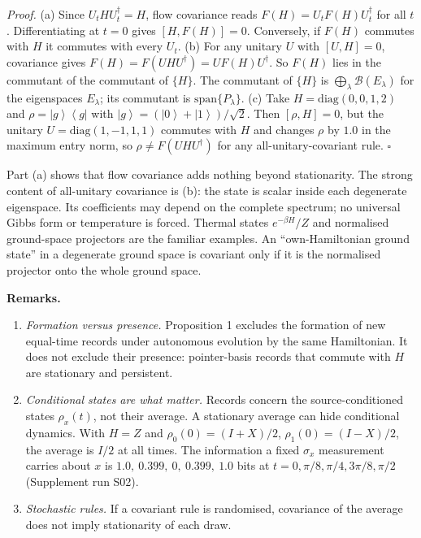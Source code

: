 \documentclass[
  10pt,
  a4paper,
]{article}
\providecommand{\tightlist}{%
  \setlength{\itemsep}{0pt}\setlength{\parskip}{0pt}}
\begin{document}
\emph{Proof.} (a) Since \(U_tHU_t^\dagger=H\), flow covariance reads
\(F(H)=U_tF(H)U_t^\dagger\) for all \(t\). Differentiating at \(t=0\)
gives \([H,F(H)]=0\). Conversely, if \(F(H)\) commutes with \(H\) it
commutes with every \(U_t\). (b) For any unitary \(U\) with \([U,H]=0\),
covariance gives \(F(H)=F(UHU^\dagger)=UF(H)U^\dagger\). So \(F(H)\)
lies in the commutant of the commutant of \(\{H\}\). The commutant of
\(\{H\}\) is \(\bigoplus_\lambda\mathcal B(E_\lambda)\) for the
eigenspaces \(E_\lambda\); its commutant is
\(\mathrm{span}\{P_\lambda\}\). (c) Take \(H=\mathrm{diag}(0,0,1,2)\)
and \(\rho=\left| g\right\rangle \left\langle  g\right|\) with
\(\left| g\right\rangle =(\left| 0\right\rangle +\left| 1\right\rangle )/\sqrt2\).
Then \([\rho,H]=0\), but the unitary \(U=\mathrm{diag}(1,-1,1,1)\)
commutes with \(H\) and changes \(\rho\) by \(1.0\) in the maximum entry
norm, so \(\rho\ne F(UHU^\dagger)\) for any all-unitary-covariant rule.
\(\square\)

Part (a) shows that flow covariance adds nothing beyond stationarity.
The strong content of all-unitary covariance is (b): the state is scalar
inside each degenerate eigenspace. Its coefficients may depend on the
complete spectrum; no universal Gibbs form or temperature is forced.
Thermal states \(e^{-\beta H}/Z\) and normalised ground-space projectors
are the familiar examples. An ``own-Hamiltonian ground state'' in a
degenerate ground space is covariant only if it is the normalised
projector onto the whole ground space.

\textbf{Remarks.}

\begin{enumerate}
\def\labelenumi{\arabic{enumi}.}
\tightlist
\item
  \emph{Formation versus presence.} Proposition 1 excludes the formation
  of new equal-time records under autonomous evolution by the same
  Hamiltonian. It does not exclude their presence: pointer-basis records
  that commute with \(H\) are stationary and persistent.
\item
  \emph{Conditional states are what matter.} Records concern the
  source-conditioned states \(\rho_x(t)\), not their average. A
  stationary average can hide conditional dynamics. With \(H=Z\) and
  \(\rho_0(0)=(I+X)/2\), \(\rho_1(0)=(I-X)/2\), the average is \(I/2\)
  at all times. The information a fixed \(\sigma_x\) measurement carries
  about \(x\) is \(1.0,\ 0.399,\ 0,\ 0.399,\ 1.0\) bits at
  \(t=0,\pi/8,\pi/4,3\pi/8,\pi/2\) (Supplement run S02).
\item
  \emph{Stochastic rules.} If a covariant rule is randomised, covariance
  of the average does not imply stationarity of each draw.
\end{enumerate}
\end{document}
